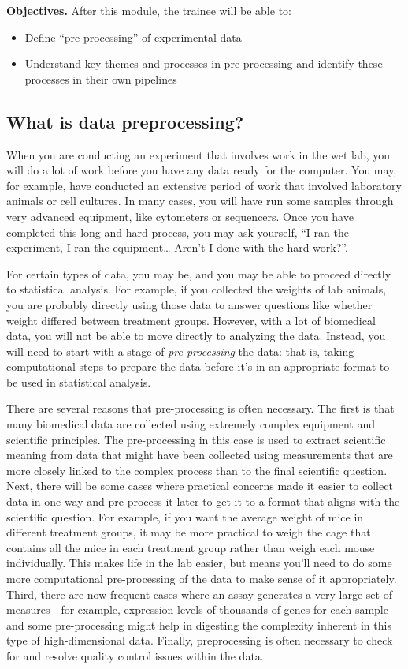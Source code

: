 \documentclass[]{tufte-book}
\providecommand{\tightlist}{%
  \setlength{\itemsep}{0pt}\setlength{\parskip}{0pt}}
\begin{document}
\textbf{Objectives.} After this module, the trainee will be able to:

\begin{itemize}
\tightlist
\item
  Define ``pre-processing'' of experimental data
\item
  Understand key themes and processes in pre-processing and identify these
  processes in their own pipelines
\end{itemize}

\subsection{What is data preprocessing?}\label{what-is-data-preprocessing}

When you are conducting an experiment that involves work in the wet lab, you
will do a lot of work before you have any data ready for the computer. You may,
for example, have conducted an extensive period of work that involved laboratory
animals or cell cultures. In many cases, you will have run some samples through
very advanced equipment, like cytometers or sequencers. Once you have completed
this long and hard process, you may ask yourself, ``I ran the experiment, I ran
the equipment\ldots{} Aren't I done with the hard work?''.

For certain types of data, you may be, and you may be able to proceed directly to
statistical analysis. For example, if you collected the weights of lab animals,
you are probably directly using those data to answer questions like whether weight
differed between treatment groups. However, with a lot of biomedical data, you
will not be able to move directly to analyzing the data. Instead, you will need
to start with a stage of \emph{pre-processing} the data: that is, taking
computational steps to prepare the data before it's in an appropriate format to
be used in statistical analysis.

There are several reasons that pre-processing is often necessary. The first is
that many biomedical data are collected using extremely complex equipment and
scientific principles. The pre-processing in this case is used to extract scientific
meaning from data that might have been collected using measurements that are
more closely linked to the complex process than to the final scientific question.
Next, there will be some cases where practical concerns made it easier to
collect data in one way and pre-process it later to get it to a format that
aligns with the scientific question. For example, if you want the average weight
of mice in different treatment groups, it may be more practical to weigh the
cage that contains all the mice in each treatment group rather than weigh
each mouse individually. This makes life in the lab easier, but means you'll need
to do some more computational pre-processing of the data to make sense of it
appropriately. Third, there are now frequent cases where an assay generates
a very large set of measures---for example, expression levels of thousands of
genes for each sample---and some pre-processing might help in digesting the
complexity inherent in this type of high-dimensional data. Finally, preprocessing
is often necessary to check for and resolve quality control issues within the
data.
\end{document}
